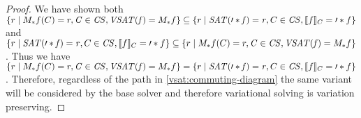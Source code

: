 \begin{proof}
  We have shown both $\setc{r}{\submodel{f}{C} = r, \kf{C} \in \kf{CS},
    \kf{VSAT(f)} = \vmodel*{f}} \subseteq \setc{r}{\kf{SAT(\prime*{f}) = r}, C
    \in \kf{CS}, \sem[C]{f} = \prime*{f}}$ and $\setc{r}{\kf{SAT(\prime*{f}) =
      r}, C \in \kf{CS}, \sem[C]{f} = \prime*{f}} \subseteq
  \setc{r}{\submodel{f}{C} = r, \kf{C} \in \kf{CS}, \kf{VSAT(f)} =
    \vmodel*{f}}$. Thus we have $\setc{r}{\submodel{f}{C} = r, \kf{C} \in
    \kf{CS}, \kf{VSAT(f)} = \vmodel*{f}} = \setc{r}{\kf{SAT(\prime*{f}) = r}, C
    \in \kf{CS}, \sem[C]{f} = \prime*{f}}$. Therefore, regardless of the path in
  \autoref{vsat:commuting-diagram} the same variant will be considered by the
  base solver and therefore variational solving is variation preserving.
\end{proof}


